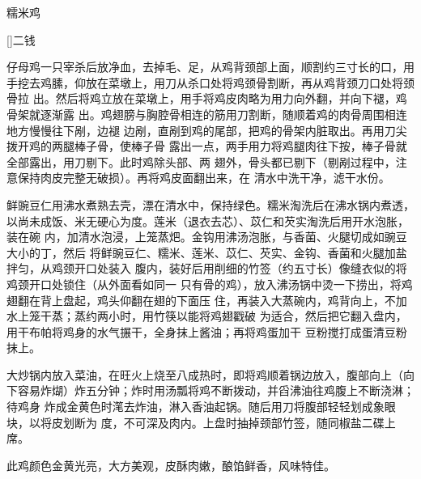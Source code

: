 \begin{recipe}[八宝糯米鸡]{糯米鸡}

\ingredients

[\footnotemark]{二钱}

\preparation

\step 仔母鸡一只宰杀后放净血，去掉毛、足，从鸡背颈部上面，顺割约三寸长的口，用
手挖去鸡膆，仰放在菜墩上，用刀从杀口处将鸡颈骨割断，再从鸡背颈刀口处将颈骨拉
出。然后将鸡立放在菜墩上，用手将鸡皮肉略为用力向外翻，并向下褪，鸡骨架就逐渐露
出。鸡翅膀与胸腔骨相连的筋用刀割断，随顺着鸡的肉骨周围相连地方慢慢往下剐，边褪
边剐，直剐到鸡的尾部，把鸡的骨架内脏取出。再用刀尖拨开鸡的两腿棒子骨，使棒子骨
露出一点，两手用力将鸡腿肉往下按，棒子骨就全部露出，用刀剔下。此时鸡除头部、两
翅外，骨头都已剔下（剔剐过程中，注意保持肉皮完整无破损）。再将鸡皮面翻出来，在
清水中洗干净，滤干水份。

\step 鲜豌豆仁用沸水煮熟去壳，漂在清水中，保持绿色。糯米淘洗后在沸水锅内煮透，
以尚未成饭、米无硬心为度。莲米（退衣去芯）、苡仁和芡实淘洗后用开水泡胀，装在碗
内，加清水泡浸，上笼蒸𤆵。金钩用沸汤泡胀，与香菌、火腿切成如豌豆大小的丁，然后
将鲜豌豆仁、糯米、莲米、苡仁、芡实、金钩、香菌和火腿加盐拌匀，从鸡颈开口处装入
腹内，装好后用削细的竹签（约五寸长）像缝衣似的将鸡颈开口处锁住（从外面看如同一
只有骨的鸡），放入沸汤锅中烫一下捞出，将鸡翅翻在背上盘起，鸡头仰翻在翅的下面压
住，再装入大蒸碗内，鸡背向上，不加水上笼干蒸；蒸约两小时，用竹筷以能将鸡翅戳破
为适合，然后把它翻入盘内，用干布帕将鸡身的水气搌干，全身抹上酱油；再将鸡蛋加干
豆粉搅打成蛋清豆粉抹上。

\step 大炒锅内放入菜油，在旺火上烧至八成热时，即将鸡顺着锅边放入，腹部向上（向
下容易炸煳）炸五分钟；炸时用汤瓢将鸡不断拨动，并舀沸油往鸡腹上不断浇淋；待鸡身
炸成金黄色时滗去炸油，淋入香油起锅。随后用刀将腹部轻轻划成象眼块，以将皮划断为
度，不可深及肉内。上盘时抽掉颈部竹签，随同椒盐二碟上席。

\features

此鸡颜色金黄光亮，大方美观，皮酥肉嫩，酿馅鲜香，风味特佳。


\end{recipe}

